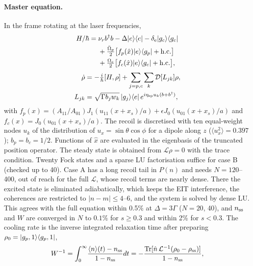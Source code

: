 \documentclass[10pt,twocolumn,a4paper]{article}
\begin{document}
\paragraph{Master equation.}
In the frame rotating at the laser frequencies,
\begin{equation}
\begin{aligned}
  H/\hbar={}&\nu_r b^\dagger b-\Delta|e\rangle\langle e|-\delta_{\rm e}|g_c\rangle\langle g_c|\\
  &+\tfrac{\bar{\Omega}_p}{2}\big[f_p(\hat x)|e\rangle\langle g_p|+{\rm h.c.}\big]\\
  &+\tfrac{\Omega_c}{2}\big[f_c(\hat x)|e\rangle\langle g_c|+{\rm h.c.}\big],
\end{aligned}
\end{equation}
\begin{equation}
\begin{aligned}
  \dot\rho&=-\tfrac i\hbar[H,\rho]+\sum_{j=p,c}\sum_k\mathcal D[L_{jk}]\rho,\\
  L_{jk}&=\sqrt{\Gamma b_jw_k}\,|g_j\rangle\langle e|\,e^{i\eta_{\rm sp}u_k(b+b^\dagger)},
\end{aligned}
\end{equation}
with $f_p(x)=(A_{11}/A_{01})J_1(u_{11}(x+x_s)/a)+\epsilon J_0(u_{01}(x+x_s)/a)$ and $f_c(x)=J_0(u_{01}(x+x_s)/a)$. The recoil is discretised with ten equal-weight nodes $u_k$ of the distribution of $u_x=\sin\theta\cos\phi$ for a dipole along $z$ ($\langle u_x^2\rangle=0.397$)\cite{cirac1992}; $b_p=b_c=1/2$. Functions of $\hat x$ are evaluated in the eigenbasis of the truncated position operator. The steady state is obtained from $\mathcal L\rho=0$ with the trace condition. Twenty Fock states and a sparse LU factorisation suffice for case B (checked up to 40). Case A has a long recoil tail in $P(n)$ and needs $N=120$--400, out of reach for the full $\mathcal L$, whose recoil terms are nearly dense. There the excited state is eliminated adiabatically\cite{reiter2012}, which keeps the EIT interference, the coherences are restricted to $|n-m|\le4$--6, and the system is solved by dense LU. This agrees with the full equation within 0.5\% at $\Delta=3\Gamma$ ($N=20$, 40), and $n_{\rm ss}$ and $W$ are converged in $N$ to $0.1\%$ for $s\ge0.3$ and within 2\% for $s<0.3$. The cooling rate is the inverse integrated relaxation time after preparing $\rho_0=|g_p,1\rangle\langle g_p,1|$,
\begin{equation}
  W^{-1}=\int_0^\infty\!\frac{\langle n\rangle(t)-n_{\rm ss}}{1-n_{\rm ss}}dt=-\frac{{\rm Tr}[\hat n\,\mathcal L^{-1}(\rho_0-\rho_{\rm ss})]}{1-n_{\rm ss}},
\end{equation}
\end{document}
